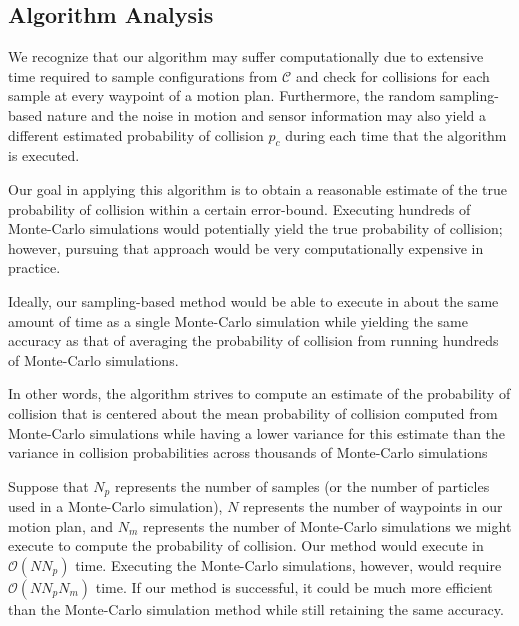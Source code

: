 \documentclass[journal]{IEEEtran}
\begin{document}
\subsection{Algorithm Analysis}
We recognize that our algorithm may suffer computationally due to extensive time required to sample configurations from $\mathcal{C}$ and check for collisions for each sample at every waypoint of a motion plan. Furthermore, the random sampling-based nature and the noise in motion and sensor information may also yield a different estimated probability of collision $p_c$ during each time that the algorithm is executed.

Our goal in applying this algorithm is to obtain a reasonable estimate of the true probability of collision within a certain error-bound. Executing hundreds of Monte-Carlo simulations would potentially yield the true probability of collision; however, pursuing that approach would be very computationally expensive in practice.

Ideally, our sampling-based method would be able to execute in about the same amount of time as a single Monte-Carlo simulation while yielding the same accuracy as that of averaging the probability of collision from running hundreds of Monte-Carlo simulations.

In other words, the algorithm strives to compute an estimate of the probability of collision that is centered about the mean probability of collision computed from Monte-Carlo simulations while having a lower variance for this estimate than the variance in collision probabilities across thousands of Monte-Carlo simulations

Suppose that $N_p$ represents the number of samples (or the number of particles used in a Monte-Carlo simulation), $N$ represents the number of waypoints in our motion plan, and $N_m$ represents the number of Monte-Carlo simulations we might execute to compute the probability of collision. Our method would execute in $\mathcal{O}(NN_p)$ time. Executing the Monte-Carlo simulations, however, would require $\mathcal{O}(NN_pN_m)$ time. If our method is successful, it could be much more efficient than the Monte-Carlo simulation method while still retaining the same accuracy.


\end{document}
